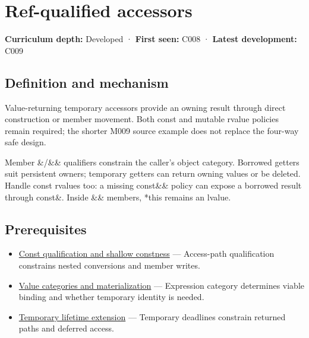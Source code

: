 \hypertarget{appendix-d42039b1d6f7}{}\label{referencestart:appendix-d42039b1d6f7}
\section{Ref-qualified accessors}\label{appendix-d42039b1d6f7-ref-qualified-accessors}

\hypertarget{appendix-d42039b1d6f7-ref-qualified-accessors}{}

\textbf{Curriculum depth:} Developed · \textbf{First seen:} C008 · \textbf{Latest development:} C009

\begin{allmightroledefinition}

\subsection{Definition and mechanism}\label{appendix-d42039b1d6f7-definition-and-mechanism}

\hypertarget{appendix-d42039b1d6f7-definition-and-mechanism}{}

Value-returning temporary accessors provide an owning result through direct construction or member movement. Both const and mutable rvalue policies remain required; the shorter M009 source example does not replace the four-way safe design.

\end{allmightroledefinition}

Member \&/\&\& qualifiers constrain the caller's object category. Borrowed getters suit persistent owners; temporary getters can return owning values or be deleted. Handle const rvalues too: a missing const\&\& policy can expose a borrowed result through const\&. Inside \&\& members, *this remains an lvalue.

\subsection{Prerequisites}\label{appendix-d42039b1d6f7-prerequisites}

\hypertarget{appendix-d42039b1d6f7-prerequisites}{}

\begin{itemize}
\tightlist
\item
  \hyperref[appendix-c25d60fed375]{Const qualification and shallow constness} --- Access-path qualification constrains nested conversions and member writes.
\item
  \hyperref[appendix-1121b30eaeb0]{Value categories and materialization} --- Expression category determines viable binding and whether temporary identity is needed.
\item
  \hyperref[appendix-a978b29bbbb0]{Temporary lifetime extension} --- Temporary deadlines constrain returned paths and deferred access.
\end{itemize}


